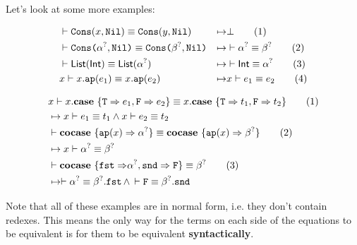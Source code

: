 \documentclass[twoside,12pt,a4paper]{article}
\begin{document}
Let's look at some more examples:
\begin{example}
    \begin{align*}
    &\vdash \mathtt{Cons(}x, \mathtt{Nil}\mathtt{)} \equiv \mathtt{Cons(}y, \mathtt{Nil}\mathtt{)}&\mapsto& \bot
    \tag{1}\\
    &\vdash \texttt{Cons(}\alpha^?, \texttt{Nil)}\equiv\texttt{Cons(}\beta^?, \texttt{Nil)}
    &\mapsto&\vdash \alpha^?\equiv \beta^?
    \tag{2}\\
    &\vdash \mathsf{List(Int)}\equiv \mathsf{List(\alpha^?)}
    &\mapsto& \vdash \mathsf{Int}\equiv \alpha^?
    \tag{3}\\
    &x \vdash x.\texttt{ap}(e_1)\equiv x.\texttt{ap}(e_2) &\mapsto& x\vdash e_1\equiv e_2 
    \tag{4}
    \end{align*}
\end{example}

\begin{example}
    \begin{align*}
    &x\vdash x.\textbf{case}\ \{\texttt{T} \Rightarrow e_1, \texttt{F} \Rightarrow e_2\} \equiv x.\textbf{case}\ \{\texttt{T} \Rightarrow t_1, \texttt{F} \Rightarrow t_2\}\tag{1}
    \\ &\mapsto x\vdash  e_1 \equiv t_1\wedge x\vdash e_2\equiv t_2\\
    &\vdash \textbf{cocase}\ \{\texttt{ap}(x)\Rightarrow \alpha^?\} \equiv \textbf{cocase}\ \{\texttt{ap}(x)\Rightarrow\beta^?\} \tag{2}
    \\ &\mapsto x\vdash \alpha^? \equiv \beta^?\\
    &\vdash\textbf{cocase}\ \{\mathtt{fst \Rightarrow} \alpha^?, \mathtt{snd\Rightarrow F}\}\equiv \beta^? \tag{3}
    \\ &\mapsto \vdash \alpha^?\equiv \beta^?.\mathtt{fst}\, \wedge \,\vdash \mathtt{F\equiv\beta^?.snd}
    \end{align*}
\end{example}
Note that all of these examples are in normal form, i.e. they don't contain redexes.
This means the only way for the terms on each side of the equations to be equivalent
is for them to be equivalent \textbf{syntactically}. 
\end{document}
